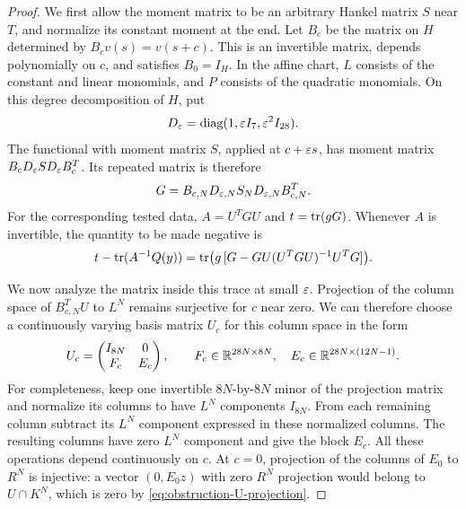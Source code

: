 \begin{proof}
We first allow the moment matrix to be an arbitrary Hankel matrix $S$
near $T$, and normalize its constant moment at the end.  Let $B_c$ be the
matrix on $H$ determined by
$B_cv(s)=v(s+c)$.  This is an invertible matrix, depends polynomially on
$c$, and satisfies $B_0=I_H$.  In the affine chart, $L$ consists of the
constant and linear monomials, and $P$ consists of the quadratic monomials.
On this degree decomposition of $H$,
put
\[
 D_\varepsilon=\operatorname{diag}(1,\varepsilon I_7,\varepsilon^2I_{28}).
\]
The functional with moment matrix $S$, applied at $c+\varepsilon s$, has moment
matrix $B_cD_\varepsilon S D_\varepsilon B_c^T$.  Its repeated matrix is therefore
\begin{equation}
 \label{eq:translated-scaled-moment}
 G=B_{c,N}D_{\varepsilon,N}S_ND_{\varepsilon,N}B_{c,N}^T.
\end{equation}
For the corresponding tested data, $A=U^TGU$ and $t=\operatorname{tr}(gG)$.
Whenever $A$ is invertible, the quantity to be made negative is
\begin{equation}
 \label{eq:trace-residual}
 t-\operatorname{tr}(A^{-1}Q(y))
 =\operatorname{tr}\bigl(g\,[G-GU(U^TGU)^{-1}U^TG]\bigr).
\end{equation}

We now analyze the matrix inside this trace at small $\varepsilon$.  Projection
of the column space of $B_{c,N}^TU$ to $L^N$ remains surjective for $c$
near zero.  We can therefore choose a continuously varying basis matrix
$U_c$ for this column space in the form
\begin{equation}
 \label{eq:Uc-blocks}
 U_c=\begin{pmatrix}I_{8N}&0\\ F_c&E_c\end{pmatrix},
 \qquad
 F_c\in\mathbb R^{28N\times8N},\quad
 E_c\in\mathbb R^{28N\times(12N-1)}.
\end{equation}
For completeness, keep one invertible $8N$-by-$8N$ minor of the projection
matrix and normalize its columns to have $L^N$ components $I_{8N}$.
From each remaining column subtract its $L^N$ component expressed in
these normalized columns.  The resulting columns have zero $L^N$
component and give the block $E_c$.  All these operations depend
continuously on $c$.  At $c=0$, projection of the
columns of $E_0$ to $R^N$ is injective: a vector $(0,E_0z)$ with zero
$R^N$ projection would belong to $U\cap K^N$, which is zero by
\eqref{eq:obstruction-U-projection}.


\end{proof}
